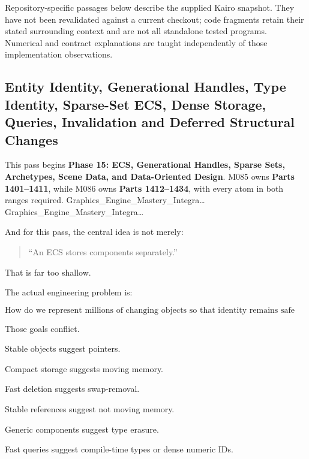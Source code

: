 Repository-specific passages below describe the supplied Kairo snapshot. They have not been revalidated against a current checkout; code fragments retain their stated surrounding context and are not all standalone tested programs. Numerical and contract explanations are taught independently of those implementation observations.

\subsection{Entity Identity, Generational Handles, Type Identity, Sparse-Set ECS, Dense Storage, Queries, Invalidation and Deferred Structural Changes}\label{05-engine-i-ch014-entity-identity-generational-handles-type-identity-sparse-set-ecs-dense-storage-queries-invalidation-and-deferred-structural-changes}

\hypertarget{05-engine-i-ch014-entity-identity-generational-handles-type-identity-sparse-set-ecs-dense-storage-queries-invalidation-and-deferred-structural-changes}{}

This pass begins \textbf{Phase 15: ECS, Generational Handles, Sparse Sets, Archetypes, Scene Data, and Data-Oriented Design}. M085 owns \textbf{Parts 1401--1411}, while M086 owns \textbf{Parts 1412--1434}, with every atom in both ranges required. Graphics\_Engine\_Mastery\_Integra\ldots{} Graphics\_Engine\_Mastery\_Integra\ldots{}

And for this pass, the central idea is not merely:

\begin{quote}
``An ECS stores components separately.''
\end{quote}

That is far too shallow.

The actual engineering problem is:

\[
\boxed{
\text{How do we represent millions of changing objects so that identity remains safe while data remains compact, cache-friendly, queryable and mutable?}
}
\]

Those goals conflict.

Stable objects suggest pointers.

Compact storage suggests moving memory.

Fast deletion suggests swap-removal.

Stable references suggest not moving memory.

Generic components suggest type erasure.

Fast queries suggest compile-time types or dense numeric IDs.

